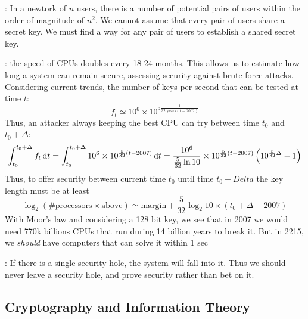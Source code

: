 \documentclass[11pt,a4paper]{article}
\begin{document}
: In a newtork of $n$ users, there is a number of potential pairs of users within the order of magnitude of $n^2$. We cannot assume that every pair of users share a secret key. We must find a way for any pair of users to establish a shared secret key.

: the speed of CPUs doubles every 18-24 months. This allows us to estimate how long a system can remain secure, assessing security against brute force attacks. Considering current trends, the number of keys per second that can be tested at time $t$:
\[f_t \simeq 10^6 \times 10^{5\frac{1}{32 \text{ years}(t-2007)}}\]
Thus, an attacker always keeping the best CPU can try between time $t_0$ and $t_0 + \Delta$:
\[
    \int_{t_0}^{t_0+\Delta} f_t \, \mathrm d t = \int_{t_0}^{t_0+\Delta}10^6 \times 10^{\frac{5}{32}(t-2007)} \, \mathrm d t = \frac{10^6}{\frac{5}{32}\ln10} \times 10^{\frac{5}{32}(t-2007)}\left( 10^{\frac{5}{32}\Delta} - 1 \right)
\]
Thus, to offer security between current time $t_0$ until time $t_0 + Delta$ the key length must be at least
\[\log_2(\#\text{processors}\times\text{above}) \simeq \text{margin}+\frac{5}{32}\log_2 10 \times (t_0 + \Delta - 2007)\]
With Moor's law and considering a 128 bit key, we see that in 2007 we would need 770k billions CPUs that run during 14 billion years to break it. But in 2215, we \textit{should} have computers that can solve it within 1 sec

: If there is a single security hole, the system will fall into it. Thus we should never leave a security hole, and prove security rather than bet on it.

\subsection{Cryptography and Information Theory}
\end{document}
